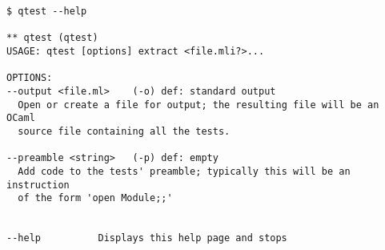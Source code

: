 
\begin{verbatim}
$ qtest --help

** qtest (qtest)
USAGE: qtest [options] extract <file.mli?>...

OPTIONS:
--output <file.ml>    (-o) def: standard output
  Open or create a file for output; the resulting file will be an OCaml
  source file containing all the tests.

--preamble <string>   (-p) def: empty
  Add code to the tests' preamble; typically this will be an instruction
  of the form 'open Module;;'


--help          Displays this help page and stops
\end{verbatim} 